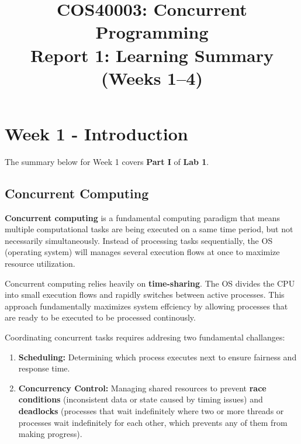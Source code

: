 \documentclass[conference]{IEEEtran}
\title{\textbf{COS40003: Concurrent Programming}\\
\Large Report 1: Learning Summary (Weeks 1--4)}
\author{\IEEEauthorblockN{Dang Duc Minh}
\IEEEauthorblockA{Student ID: 105559691}}
\begin{document}
\maketitle
\thispagestyle{plain}

\section{Week 1 - Introduction}

\noindent The summary below for Week 1 covers \textbf{Part I} of \textbf{Lab 1}.

\subsection{Concurrent Computing}
\textbf{Concurrent computing} is a fundamental computing paradigm that means multiple computational 
tasks are being executed on a same time period, but not necessarily 
simultaneously. Instead of processing tasks sequentially, the OS (operating system) will manages 
several execution flows at once to maximize resource utilization.

\hspace{5pt}

\noindent Concurrent computing relies heavily on \textbf{time-sharing}. The OS divides 
the CPU into small execution flows and rapidly switches between active processes. This approach
fundamentally maximizes system effciency by allowing processes that are ready to be executed to be
processed continously.

\hspace{5pt}

\noindent Coordinating concurrent tasks requires addresing two fundamental challanges:
 

\begin{enumerate}
    \item \textbf{Scheduling:} Determining which process executes next to ensure fairness and response time.
    \item \textbf{Concurrency Control:} Managing shared resources to prevent \textbf{race conditions} (inconsistent data or state caused by timing issues) and \textbf{deadlocks} (processes that wait indefinitely where two or more threads or processes wait indefinitely for each other, which prevents any of them from making progress).
\end{enumerate}
\end{document}
